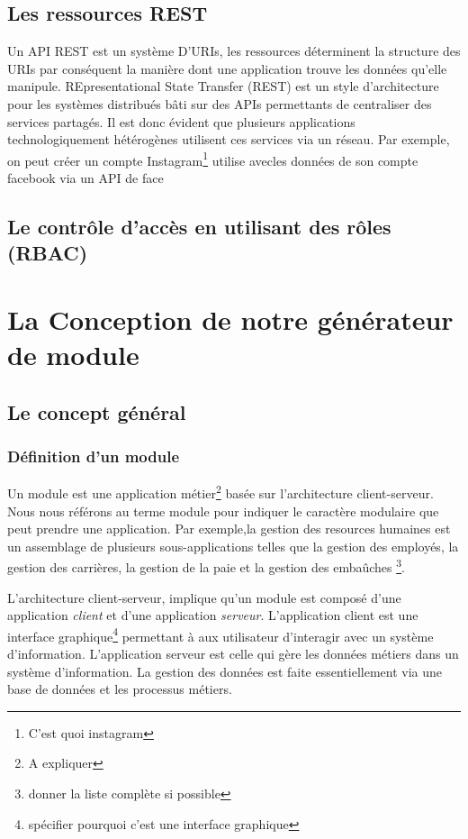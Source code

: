 \documentclass[a4paper,11pt]{report}
\begin{document}
  

\section{Les ressources REST}
Un API REST est un système D'URIs, les ressources déterminent la structure des URIs par 
conséquent  la manière dont une application trouve les données qu'elle manipule.
REpresentational State Transfer (REST) est un style d’architecture pour les systèmes
distribués bâti sur des APIs permettants de centraliser des services partagés. Il est 
donc évident que plusieurs applications technologiquement hétérogènes utilisent ces services
via un réseau. Par exemple, on peut créer un compte Instagram\footnote{C'est quoi instagram}
utilise avecles données de son compte facebook via un API de face





\section{Le contrôle d'accès en utilisant des rôles (RBAC)}

\chapter{La Conception de notre générateur de module}
\section{Le concept général}
\subsection{Définition d'un module}

Un module est une application métier\footnote{A expliquer} basée sur
l'architecture client-serveur. Nous nous référons au terme module pour
indiquer le caractère modulaire que peut prendre une application. Par
exemple,la gestion des resources humaines est un assemblage de
plusieurs sous-applications telles que la gestion des employés, la
gestion des carrières, la gestion de la paie et la gestion des
embaûches \footnote{donner la liste complète si possible}. 

L'architecture client-serveur, implique qu'un module est composé
d'une application {\em client} et d'une application {\em serveur}.
L'application client est une interface graphique\footnote{spécifier
  pourquoi c'est une interface graphique } permettant à
aux utilisateur d'interagir avec un système d'information.
L'application serveur est celle qui gère les données métiers dans un
système d'information.
La gestion des données est faite essentiellement via une base de
données et les processus métiers. 
\end{document}
